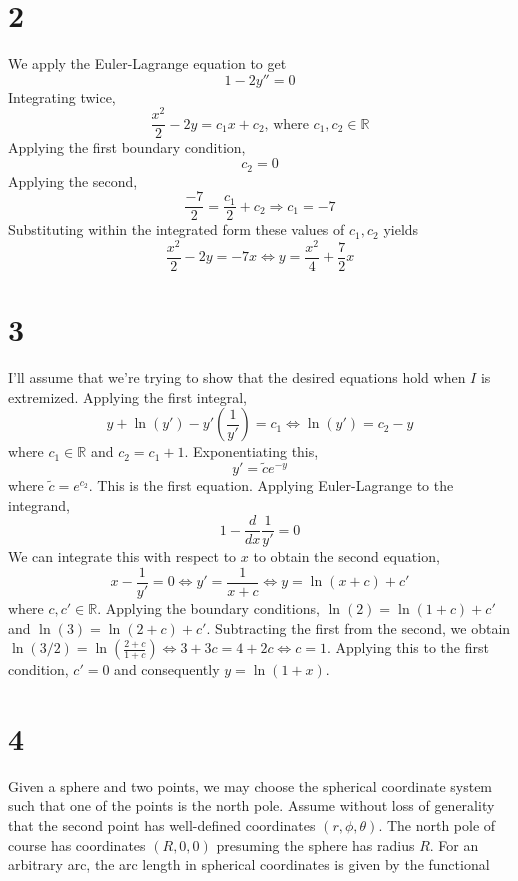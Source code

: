 \documentclass{article}
\begin{document}
\section*{2}
We apply the Euler-Lagrange equation to get
\[1-2y''=0\]
Integrating twice,
\[\frac{x^2}{2}-2y=c_1x+c_2\textrm{, where }c_1,c_2\in\mathbb{R}\]
Applying the first boundary condition,
\[c_2 = 0\]
Applying the second,
\[\frac{-7}{2}=\frac{c_1}{2}+c_2\Rightarrow c_1 = -7\]
Substituting within the integrated form these values of $c_1,c_2$ yields
\[\frac{x^2}{2}-2y=-7x\Leftrightarrow y =\frac{x^2}{4}+\frac{7}{2}x\]
\section*{3}
I'll assume that we're trying to show that the desired equations hold when $I$ is extremized.
Applying the first integral,
\[y+\ln(y')-y'\left( \frac{1}{y'} \right)=c_1\Leftrightarrow  \ln(y')=c_2-y\]
where $c_1\in\mathbb{R}$ and $c_2=c_1+1$.
Exponentiating this,
\[y'=\tilde{c}e^{-y}\]
where $\tilde{c}=e^{c_2}$. This is the first equation.
Applying Euler-Lagrange to the integrand,
\[1-\frac{d}{dx}\frac{1}{y'}= 0\]
We can integrate this with respect to $x$ to obtain the second equation,
\[x-\frac{1}{y'}=0\Leftrightarrow y' = \frac{1}{x+c}\Leftrightarrow y = \ln(x+c)+c'\]
where $c,c'\in\mathbb{R}$. Applying the boundary conditions, $\ln(2) = \ln(1+c)+c'$ and $\ln(3)=\ln(2+c)+c'$.
Subtracting the first from the second, we obtain $\ln(3/2) = \ln(\frac{2+c}{1+c}) \Leftrightarrow 3+3c=4+2c\Leftrightarrow c=1$.
Applying this to the first condition, $c'=0$ and consequently $y=\ln(1+x)$.

\section*{4}
Given a sphere and two points, we may choose the spherical coordinate system such that one of the points is the north pole.
Assume without loss of generality that the second point has well-defined coordinates $(r,\phi,\theta)$. The north pole of course has coordinates $(R, 0, 0)$ presuming the sphere has radius $R$. For an arbitrary arc, the arc length in spherical coordinates is given by the functional
\end{document}
